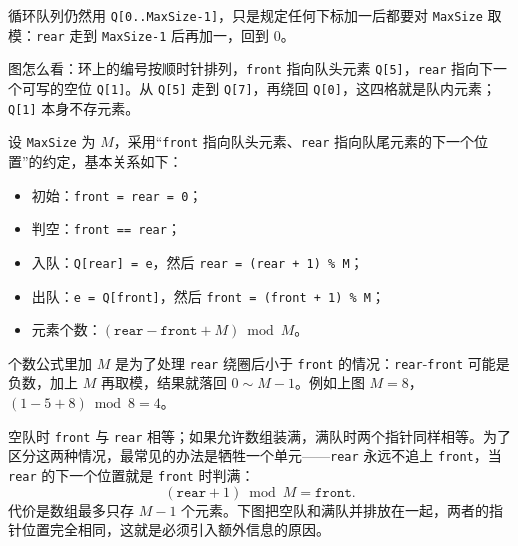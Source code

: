 循环队列仍然用 \texttt{Q[0..MaxSize-1]}，只是规定任何下标加一后都要对 \texttt{MaxSize} 取模：\texttt{rear} 走到 \texttt{MaxSize-1} 后再加一，回到 $0$。

\begin{center}
\end{center}
{\footnotesize\noindent 图怎么看：环上的编号按顺时针排列，\texttt{front} 指向队头元素 \texttt{Q[5]}，\texttt{rear} 指向下一个可写的空位 \texttt{Q[1]}。从 \texttt{Q[5]} 走到 \texttt{Q[7]}，再绕回 \texttt{Q[0]}，这四格就是队内元素；\texttt{Q[1]} 本身不存元素。\par}

设 \texttt{MaxSize} 为 $M$，采用“\texttt{front} 指向队头元素、\texttt{rear} 指向队尾元素的下一个位置”的约定，基本关系如下：
\begin{itemize}
    \item 初始：\texttt{front = rear = 0}；
    \item 判空：\texttt{front == rear}；
    \item 入队：\texttt{Q[rear] = e}，然后 \texttt{rear = (rear + 1) \% M}；
    \item 出队：\texttt{e = Q[front]}，然后 \texttt{front = (front + 1) \% M}；
    \item 元素个数：$(\texttt{rear}-\texttt{front}+M)\bmod M$。
\end{itemize}
\noindent 个数公式里加 $M$ 是为了处理 \texttt{rear} 绕圈后小于 \texttt{front} 的情况：\texttt{rear}-\texttt{front} 可能是负数，加上 $M$ 再取模，结果就落回 $0\sim M-1$。例如上图 $M=8$，$(1-5+8)\bmod 8=4$。

空队时 \texttt{front} 与 \texttt{rear} 相等；如果允许数组装满，满队时两个指针同样相等。为了区分这两种情况，最常见的办法是牺牲一个单元——\texttt{rear} 永远不追上 \texttt{front}，当 \texttt{rear} 的下一个位置就是 \texttt{front} 时判满：
\[
(\texttt{rear}+1)\bmod M=\texttt{front}.
\]
代价是数组最多只存 $M-1$ 个元素。下图把空队和满队并排放在一起，两者的指针位置完全相同，这就是必须引入额外信息的原因。

